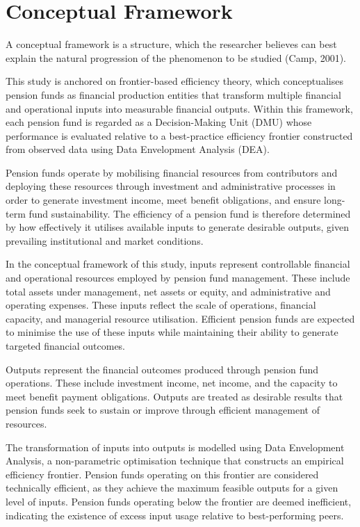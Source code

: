 \documentclass[12pt,a4paper]{article}
\begin{document}
\section{Conceptual Framework}

A conceptual framework is a structure, which the researcher believes can best explain the natural progression of the phenomenon to be studied (Camp, 2001).

This study is anchored on frontier-based efficiency theory, which conceptualises pension funds as financial production entities that transform multiple financial and operational inputs into measurable financial outputs. Within this framework, each pension fund is regarded as a Decision-Making Unit (DMU) whose performance is evaluated relative to a best-practice efficiency frontier constructed from observed data using Data Envelopment Analysis (DEA).

Pension funds operate by mobilising financial resources from contributors and deploying these resources through investment and administrative processes in order to generate investment income, meet benefit obligations, and ensure long-term fund sustainability. The efficiency of a pension fund is therefore determined by how effectively it utilises available inputs to generate desirable outputs, given prevailing institutional and market conditions.

In the conceptual framework of this study, inputs represent controllable financial and operational resources employed by pension fund management. These include total assets under management, net assets or equity, and administrative and operating expenses. These inputs reflect the scale of operations, financial capacity, and managerial resource utilisation. Efficient pension funds are expected to minimise the use of these inputs while maintaining their ability to generate targeted financial outcomes.

Outputs represent the financial outcomes produced through pension fund operations. These include investment income, net income, and the capacity to meet benefit payment obligations. Outputs are treated as desirable results that pension funds seek to sustain or improve through efficient management of resources.

The transformation of inputs into outputs is modelled using Data Envelopment Analysis, a non-parametric optimisation technique that constructs an empirical efficiency frontier. Pension funds operating on this frontier are considered technically efficient, as they achieve the maximum feasible outputs for a given level of inputs. Pension funds operating below the frontier are deemed inefficient, indicating the existence of excess input usage relative to best-performing peers.
\end{document}

